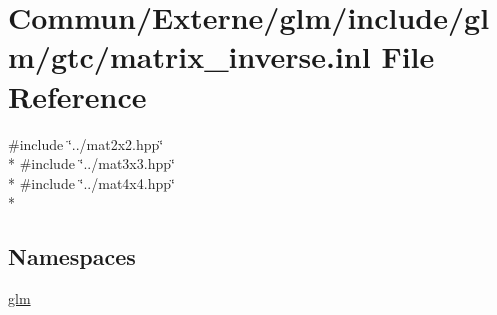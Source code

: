 \hypertarget{matrix__inverse_8inl}{}\section{Commun/\+Externe/glm/include/glm/gtc/matrix\+\_\+inverse.inl File Reference}
\label{matrix__inverse_8inl}
{\ttfamily \#include \char`\"{}../mat2x2.\+hpp\char`\"{}}\\*
{\ttfamily \#include \char`\"{}../mat3x3.\+hpp\char`\"{}}\\*
{\ttfamily \#include \char`\"{}../mat4x4.\+hpp\char`\"{}}\\*
\subsection*{Namespaces}
\begin{DoxyCompactItemize}
\item 
 \hyperlink{namespaceglm}{glm}
\end{DoxyCompactItemize}
